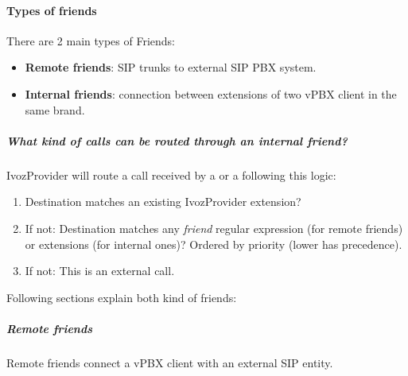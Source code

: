 \documentclass[letterpaper,10pt,spanish]{sphinxmanual}
\begin{document}
\paragraph{Types of friends}
\label{administration_portal/client/vpbx/routing_endpoints/friends/index:types-of-friends}
There are 2 main types of Friends:
\begin{itemize}
\item {} 
\textbf{Remote friends}: SIP trunks to external SIP PBX system.

\item {} 
\textbf{Internal friends}: connection between extensions of two vPBX client in the same brand.

\end{itemize}


\subparagraph{What kind of calls can be routed through an \emph{internal friend}?}
\label{administration_portal/client/vpbx/routing_endpoints/friends/index:what-kind-of-calls-can-be-routed-through-an-internal-friend}
IvozProvider will route a call received by a {\hyperref[administration_portal/client/vpbx/users:users]{}} or a {\hyperref[administration_portal/client/vpbx/routing_endpoints/friends/index:friends]{}} following this logic:
\begin{enumerate}
\item {} 
Destination matches an existing IvozProvider extension?

\item {} 
If not: Destination matches any \emph{friend} regular expression (for remote friends) or extensions (for internal ones)? Ordered by priority (lower has precedence).

\item {} 
If not: This is an external call.

\end{enumerate}

Following sections explain both kind of friends:


\subparagraph{Remote friends}
\label{administration_portal/client/vpbx/routing_endpoints/friends/remote_friends:remote-friends}\label{administration_portal/client/vpbx/routing_endpoints/friends/remote_friends::doc}
Remote friends connect a vPBX client with an external SIP entity.
\end{document}
